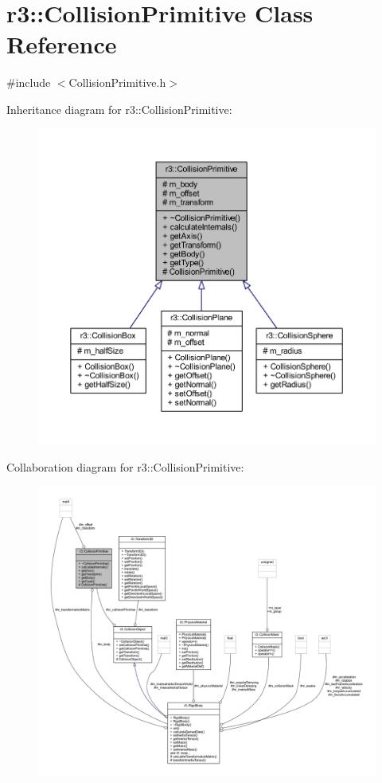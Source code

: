 \hypertarget{classr3_1_1_collision_primitive}{}\section{r3\+:\+:Collision\+Primitive Class Reference}
\label{classr3_1_1_collision_primitive}


{\ttfamily \#include $<$Collision\+Primitive.\+h$>$}



Inheritance diagram for r3\+:\+:Collision\+Primitive\+:\nopagebreak
\begin{figure}[H]
\begin{center}
\leavevmode
\includegraphics[width=350pt]{classr3_1_1_collision_primitive__inherit__graph}
\end{center}
\end{figure}


Collaboration diagram for r3\+:\+:Collision\+Primitive\+:\nopagebreak
\begin{figure}[H]
\begin{center}
\leavevmode
\includegraphics[width=350pt]{classr3_1_1_collision_primitive__coll__graph}
\end{center}
\end{figure}
